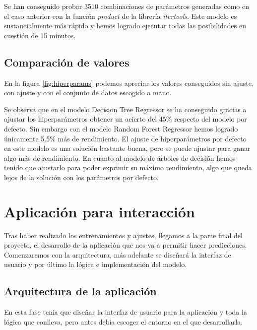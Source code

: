 Se han conseguido probar 3510 combinaciones de parámetros generadas como en el caso anterior con la función \textit{product} de la librería \textit{itertools}. Este modelo es sustancialmente más rápido y hemos logrado ejecutar todas las posibilidades en cuestión de 15 minutos.

\subsection{Comparación de valores}
En la figura \ref{fig:hiperparams} podemos apreciar los valores conseguidos sin ajuste, con ajuste y con el conjunto de datos escogido a mano.

Se observa que en el modelo Decision Tree Regressor se ha conseguido gracias a ajustar los hiperparámetros obtener un acierto del 45\% respecto del modelo por defecto. Sin embargo con el modelo Random Forest Regressor hemos logrado únicamente 5.5\% más de rendimiento. El ajuste de hiperparámetros por defecto en este modelo es una solución bastante buena, pero se puede ajustar para ganar algo más de rendimiento. En cuanto al modelo de árboles de decisión hemos tenido que ajustarlo para poder exprimir su máximo rendimiento, algo que queda lejos de la solución con los parámetros por defecto.


\section{Aplicación para interacción}

Tras haber realizado los entrenamientos y ajustes, llegamos a la parte final del proyecto, el desarrollo de la aplicación que nos va a permitir hacer predicciones. Comenzaremos con la arquitectura, más adelante se diseñará la interfaz de usuario y por último la lógica e implementación del modelo.

\subsection{Arquitectura de la aplicación}

En esta fase tenía que diseñar la interfaz de usuario para la aplicación y toda la lógica que conlleva, pero antes debía escoger el entorno en el que desarrollarla.

